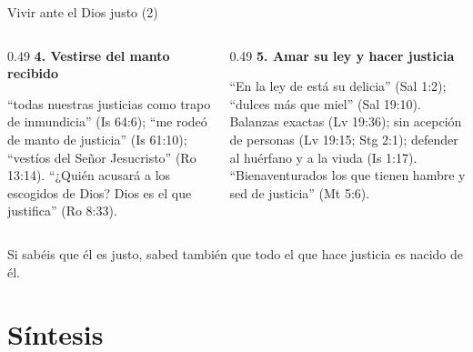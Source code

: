 \begin{frame}{Vivir ante el Dios justo (2)}
\begin{columns}[t,onlytextwidth]
\begin{column}{0.49\textwidth}
\textbf{\color{azul}4. Vestirse del manto recibido}\par\small
``todas nuestras justicias como trapo de inmundicia'' (Is 64:6); ``me rodeó de manto de justicia'' (Is 61:10); ``vestíos del Señor Jesucristo'' (Ro 13:14). ``¿Quién acusará a los escogidos de Dios? Dios es el que justifica'' (Ro 8:33).
\end{column}
\begin{column}{0.49\textwidth}
\textbf{\color{azul}5. Amar su ley y hacer justicia}\par\small
``En la ley de \SENOR{} está su delicia'' (Sal 1:2); ``dulces más que miel'' (Sal 19:10).
Balanzas exactas (Lv 19:36); sin acepción de personas (Lv 19:15; Stg 2:1); defender al huérfano y a la viuda (Is 1:17). ``Bienaventurados los que tienen hambre y sed de justicia'' (Mt 5:6).
\end{column}
\end{columns}\par\bigskip
\begin{cita}Si sabéis que él es justo, sabed también que todo el que hace justicia es nacido de él.\end{cita}
\end{frame}

\section{Síntesis}


